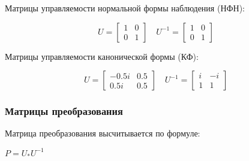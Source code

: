 Матрицы управляемости нормальной формы наблюдения (НФН):

\begin{equation*}
\text{$U=\begin{bmatrix} 1 &         0 \\
         0  &  1 \end{bmatrix}$}
\quad
\text{$U^{-1}=\begin{bmatrix} 1  &      0 \\
         0  &  1 \end{bmatrix}$}
\end{equation*}

Матрицы управляемости канонической формы (КФ):

\begin{equation*}
\text{$U=\begin{bmatrix}  -0.5i  &  0.5 \\
    0.5i  & 0.5 \end{bmatrix}$}
\quad
\text{$U^{-1}=\begin{bmatrix}i &   -i \\
    1  &  1 \end{bmatrix}$}
\end{equation*}

\subsubsection{Матрицы преобразования}

Матрица преобразования высчитывается по формуле:

\begin{center}
$P=U_{*}U^{-1}$
\end{center}


